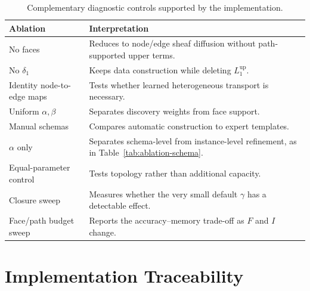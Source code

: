 \begin{table}[t]
  \centering
  \caption{Complementary diagnostic controls supported by the implementation.}
  \small
  \begin{tabular}{p{}p{}}
    \toprule
    \textbf{Ablation} & \textbf{Interpretation} \\
    \midrule
    No faces & Reduces to node/edge sheaf diffusion without path-supported upper terms. \\
    No $\delta_1$ & Keeps data construction while deleting $L_1^{\mathrm{up}}$. \\
    Identity node-to-edge maps & Tests whether learned heterogeneous transport is necessary. \\
    Uniform $\alpha,\beta$ & Separates discovery weights from face support. \\
    Manual schemas & Compares automatic construction to expert templates. \\
    $\alpha$ only & Separates schema-level from instance-level refinement, as in Table~\ref{tab:ablation-schema}. \\
    Equal-parameter control & Tests topology rather than additional capacity. \\
    Closure sweep & Measures whether the very small default $\gamma$ has a detectable effect. \\
    Face/path budget sweep & Reports the accuracy--memory trade-off as $F$ and $I$ change. \\
    \bottomrule
  \end{tabular}
\end{table}

\section{Implementation Traceability}
\label{app:traceability}

